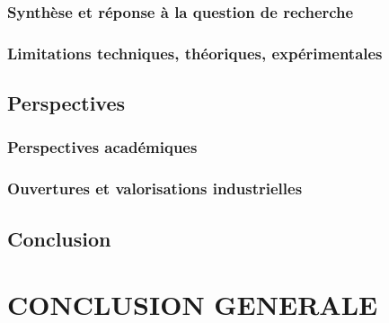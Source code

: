 \documentclass[ twoside,openright,titlepage,numbers=noenddot,headinclude,%
                footinclude=true,cleardoublepage=empty,abstractoff, %
                BCOR=5mm,paper=a4,fontsize=11pt,%
                french,american,%
                ]{scrreprt}
\begin{document}
\section{Synthèse et réponse à la question de recherche}

\section{Limitations techniques, théoriques, expérimentales}

\chapter{Perspectives}
\section{Perspectives académiques}
\section{Ouvertures et valorisations industrielles}

\chapter*{Conclusion}

\part*{CONCLUSION GENERALE}


\cleardoublepage

\appendix
\cleardoublepage


\end{document}
